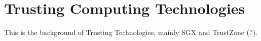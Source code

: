 \chapter{Trusting Computing Technologies}
\label{chp:background} 


This is the background of Trusting Technologies, mainly SGX and TrustZone (?).